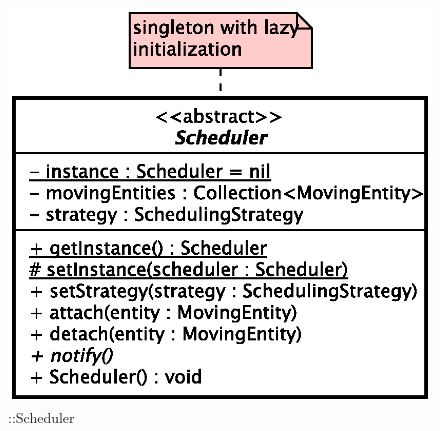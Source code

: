 \begin{figure}[h]
\centering
\includegraphics[scale=0.6,keepaspectratio]{images/solution/scheduler.eps}
\caption{\pScheduling::Scheduler}
\label{fig:sd-app-scheduling-scheduler}
\end{figure}
\FloatBarrier
